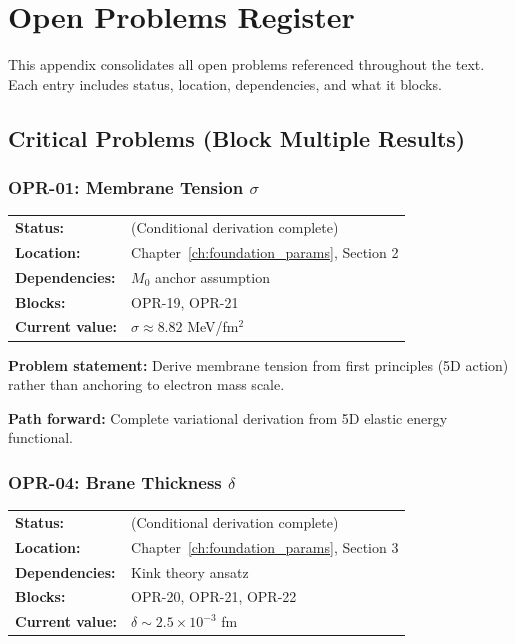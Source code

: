 \chapter{Open Problems Register}
\label{app:opr}

This appendix consolidates all open problems referenced throughout the text.
Each entry includes status, location, dependencies, and what it blocks.

\section{Critical Problems (Block Multiple Results)}

\subsection*{OPR-01: Membrane Tension $\sigma$}
\begin{tabular}{ll}
\textbf{Status:} & \tagDc{} (Conditional derivation complete) \\
\textbf{Location:} & Chapter~\ref{ch:foundation_params}, Section 2 \\
\textbf{Dependencies:} & $M_0$ anchor assumption \\
\textbf{Blocks:} & OPR-19, OPR-21 \\
\textbf{Current value:} & $\sigma \approx 8.82$ MeV/fm$^2$ \\
\end{tabular}

\textbf{Problem statement:} Derive membrane tension from first principles
(5D action) rather than anchoring to electron mass scale.

\textbf{Path forward:} Complete variational derivation from 5D elastic
energy functional.

\bigskip

\subsection*{OPR-04: Brane Thickness $\delta$}
\begin{tabular}{ll}
\textbf{Status:} & \tagDc{} (Conditional derivation complete) \\
\textbf{Location:} & Chapter~\ref{ch:foundation_params}, Section 3 \\
\textbf{Dependencies:} & Kink theory ansatz \\
\textbf{Blocks:} & OPR-20, OPR-21, OPR-22 \\
\textbf{Current value:} & $\delta \sim 2.5 \times 10^{-3}$ fm \\
\end{tabular}

